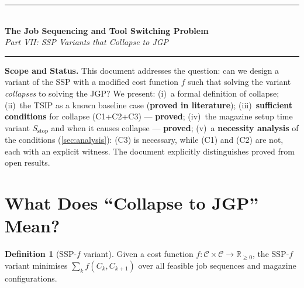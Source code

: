 \documentclass[11pt,a4paper]{article}
\theoremstyle{plain}
\theoremstyle{definition}
\newtheorem{definition}[theorem]{Definition}
\begin{document}

\begin{center}
  {\color{navyblue}\rule{\textwidth}{2pt}}\\[0.4cm]
  {\LARGE\bfseries\color{navyblue}The Job Sequencing and Tool Switching Problem}\\[0.3cm]
  {\large\itshape\color{midblue}Part VII: SSP Variants that Collapse to JGP}\\[0.2cm]
  {\color{navyblue}\rule{\textwidth}{2pt}}
\end{center}

\begin{mdframed}[backgroundcolor=lightblue,linecolor=navyblue,linewidth=1pt,
  innerleftmargin=14pt,innerrightmargin=14pt,innertopmargin=8pt,innerbottommargin=8pt]
\small\textbf{Scope and Status.}
This document addresses the question: can we design a variant of the SSP with
a modified cost function $f$ such that solving the variant \emph{collapses} to
solving the JGP? We present:
(i)~a formal definition of collapse;
(ii)~the TSIP as a known baseline case (\textbf{proved in literature});
(iii)~\textbf{sufficient conditions} for collapse (C1+C2+C3) — \textbf{proved};
(iv)~the magazine setup time variant $S_\mathrm{stop}$ and when it causes
collapse — \textbf{proved};
(v)~a \textbf{necessity analysis} of the conditions (\cref{sec:analysis}): (C3) is
necessary, while (C1) and (C2) are not, each with an explicit witness.
The document explicitly distinguishes proved from open results.
\end{mdframed}

\vspace{0.5cm}
\tableofcontents
\newpage

\section{What Does ``Collapse to JGP'' Mean?}
\label{sec:collapse_def}

\begin{definition}[SSP-$f$ variant]
Given a cost function $f: \mathcal{C} \times \mathcal{C} \to \mathbb{R}_{\ge 0}$,
the SSP-$f$ variant minimises $\sum_{k} f(C_k, C_{k+1})$ over all feasible
job sequences and magazine configurations.
\end{definition}
\end{document}
